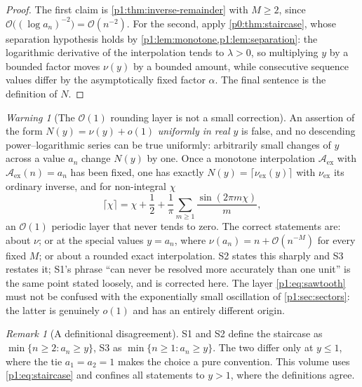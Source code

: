 \documentclass[11pt,a4paper,oneside]{book}
\theoremstyle{plain}
\theoremstyle{definition}
\theoremstyle{remark}
\newtheorem{remark}[theorem]{Remark}
\newtheorem{warning}[theorem]{Warning}
\newcommand{\bigO}{\mathcal{O}}
\newcommand{\littleo}{o}
\begin{document}
\begin{proof}
The first claim is \cref{p1:thm:inverse-remainder} with $M\ge2$, since $\bigO\bigl((\log
a_n)^{-2}\bigr)=\bigO(n^{-2})$.  For the second, apply \cref{p0:thm:staircase}, whose
separation hypothesis holds by \cref{p1:lem:monotone,p1:lem:separation}: the logarithmic
derivative of the interpolation tends to $\lambda>0$, so multiplying $y$ by a bounded factor
moves $\nu(y)$ by a bounded amount, while consecutive sequence values differ by the
asymptotically fixed factor $\alpha$.  The final sentence is the definition of $N$.
\end{proof}

\begin{warning}[The $\bigO(1)$ rounding layer is not a small correction]
\label{p1:rem:sawtooth}
An assertion of the form $N(y)=\nu(y)+\littleo(1)$ \emph{uniformly in real $y$} is false, and
no descending power--logarithmic series can be true uniformly: arbitrarily small changes of
$y$ across a value $a_n$ change $N(y)$ by one. Once a monotone interpolation $\mathcal
A_{\mathrm{ex}}$ with $\mathcal A_{\mathrm{ex}}(n)=a_n$ has been fixed, one has exactly
$N(y)=\lceil\nu_{\mathrm{ex}}(y)\rceil$ with $\nu_{\mathrm{ex}}$ its ordinary inverse, and for
non-integral $\chi$
\begin{equation}
 \lceil\chi\rceil=\chi+\frac12
 +\frac1\pi\sum_{m\ge1}\frac{\sin(2\pi m\chi)}{m},
 \label{p1:eq:sawtooth}
\end{equation}
an $\bigO(1)$ periodic layer that never tends to zero.  The correct statements are: about
$\nu$; or at the special values $y=a_n$, where $\nu(a_n)=n+\bigO(n^{-M})$ for every fixed $M$;
or about a rounded exact interpolation.  \textsf{S2} states this sharply and \textsf{S3}
restates it; \textsf{S1}'s phrase ``can never be resolved more accurately than one unit'' is
the same point stated loosely, and is corrected here.  The layer \cref{p1:eq:sawtooth} must
not be confused with the exponentially small oscillation of \cref{p1:sec:sectors}: the latter
is genuinely $\littleo(1)$ and has an entirely different origin.
\end{warning}

\begin{remark}[A definitional disagreement]
\label{p1:rem:staircase-index}
\textsf{S1} and \textsf{S2} define the staircase as $\min\{n\ge2:a_n\ge y\}$, \textsf{S3} as
$\min\{n\ge1:a_n\ge y\}$.  The two differ only at $y\le1$, where the tie $a_1=a_2=1$ makes the
choice a pure convention.  This volume uses \cref{p1:eq:staircase} and confines all statements
to $y>1$, where the definitions agree.
\end{remark}
\end{document}
